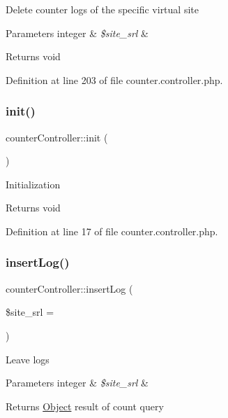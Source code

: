 Delete counter logs of the specific virtual site


\begin{DoxyParams}[1]{Parameters}
integer & {\em \$site\+\_\+srl} & \\
\hline
\end{DoxyParams}
\begin{DoxyReturn}{Returns}
void 
\end{DoxyReturn}


Definition at line 203 of file counter.\+controller.\+php.

\hypertarget{classcounterController_a38b5221a33984da33543a4b48ea739dd}{}\label{classcounterController_a38b5221a33984da33543a4b48ea739dd} 
\subsubsection{\texorpdfstring{init()}{init()}}
{\footnotesize\ttfamily counter\+Controller\+::init (\begin{DoxyParamCaption}{ }\end{DoxyParamCaption})}

Initialization

\begin{DoxyReturn}{Returns}
void 
\end{DoxyReturn}


Definition at line 17 of file counter.\+controller.\+php.

\hypertarget{classcounterController_a047bffeaae0a0e5ebe6b50225db29ef9}{}\label{classcounterController_a047bffeaae0a0e5ebe6b50225db29ef9} 
\subsubsection{\texorpdfstring{insert\+Log()}{insertLog()}}
{\footnotesize\ttfamily counter\+Controller\+::insert\+Log (\begin{DoxyParamCaption}\item[{}]{\$site\+\_\+srl = {} }\end{DoxyParamCaption})}

Leave logs


\begin{DoxyParams}[1]{Parameters}
integer & {\em \$site\+\_\+srl} & \\
\hline
\end{DoxyParams}
\begin{DoxyReturn}{Returns}
\hyperlink{classObject}{Object} result of count query 
\end{DoxyReturn}


